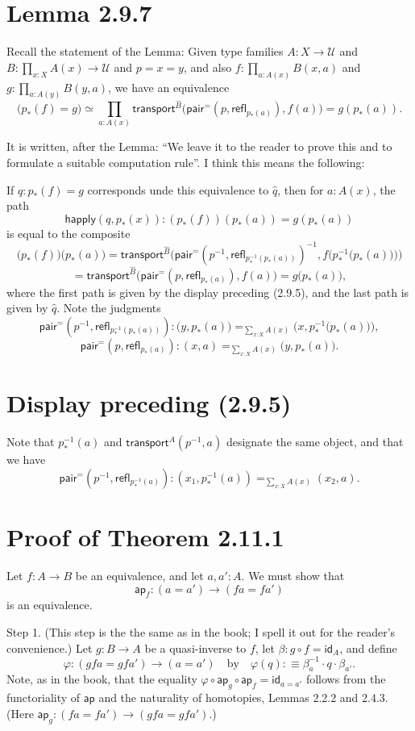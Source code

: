 \documentclass[12pt]{article}
\newcommand{\msf}{\mathsf}
\newcommand{\ap}{\mathsf{ap}}
\newcommand{\id}{\mathsf{id}}
\newcommand{\pa}{\mathsf{pair}^=}
\newcommand{\refl}{\mathsf{refl}}
\newcommand{\tr}{\mathsf{transport}}
\newcommand{\U}{\mathcal U}
\begin{document}

\section{Lemma 2.9.7}

Recall the statement of the Lemma: Given type families $A:X\to\U$ and $B:\prod_{x:X}A(x)\to\U$ and $p=x=y$, and also $f:\prod_{a:A(x)}B(x,a)$ and $g:\prod_{a:A(y)}B(y,a)$, we have an equivalence 
$$
\big(p_*(f)=g\big)\simeq\prod_{a:A(x)}\tr^{\widehat B}\Big(\pa(p,\refl_{p_*(a)}),f(a)\Big)=g(p_*(a)).
$$ 

It is written, after the Lemma: ``We leave it to the reader to prove this and to formulate a suitable computation rule''. I think this means the following:

If $q:p_*(f)=g$ corresponds unde this equivalence to $\widehat q$, then for $a:A(x)$, the path 
$$
\msf{happly}(q,p_*(x)):(p_*(f))(p_*(a))=g(p_*(a))
$$ 
is equal to the composite 
$$
\big(p_*(f)\big)\big(p_*(a)\big)=
\tr^{\widehat B}\bigg(\pa\left(p^{-1},\refl_{p^{-1}_*(p_*(a))}\right)^{-1},f\Big(p^{-1}_*\big(p_*(a)\big)\Big)\bigg)
$$
$$
=\tr^{\widehat B}\Big(\pa\left(p,\refl_{p_*(a)}\right),f(a)\Big)=g\big(p_*(a)\big),
$$ 
where the first path is given by the display preceding (2.9.5), and the last path is given by $\widehat q$. Note the judgments
$$
\pa\left(p^{-1},\refl_{p^{-1}_*(p_*(a))}\right):\big(y,p_*(a)\big)=_{\sum_{x:X}A(x)}\Big(x,p^{-1}_*\big(p_*(a)\big)\Big),
$$ 
$$
\pa\left(p,\refl_{p_*(a)}\right):(x,a)=_{\sum_{x:X}A(x)}\big(y,p_*(a)\big).
$$


\section{Display preceding (2.9.5)}

Note that $p^{-1}_*(a)$ and $\tr^A(p^{-1},a)$ designate the same object, and that we have 
$$
\pa(p^{-1},\refl_{p^{-1}_*(a)}):(x_1,p^{-1}_*(a))=_{\sum_{x:X}A(x)}(x_2,a).
$$


\section{Proof of Theorem 2.11.1}

Let $f:A\to B$ be an equivalence, and let $a,a':A$. We must show that 
$$
\ap_f:(a=a')\to (fa=fa')
$$ 
is an equivalence.

Step 1. (This step is the the same as in the book; I spell it out for the reader's convenience.) Let $g:B\to A$ be a quasi-inverse to $f$, let $\beta:g\circ f=\id_A$, and define 
$$
\varphi:(gfa=gfa')\to(a=a')\quad\text{by}\quad\varphi(q):\equiv\beta_a^{-1}\cdot q\cdot\beta_{a'}.
$$ 
Note, as in the book, that the equality $\varphi\circ\ap_g\circ\ap_f=\id_{a=a'}$ follows from the functoriality of $\ap$ and the naturality of homotopies, Lemmas 2.2.2 and 2.4.3. (Here $\ap_g:(fa=fa')\to (gfa=gfa')$.)
\end{document}
